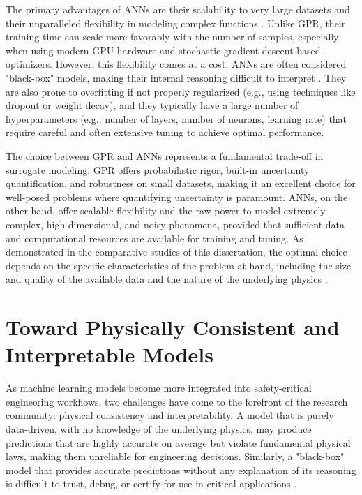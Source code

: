 \documentclass[dsc, EN]{ufabcFHZh}
\begin{document}
The primary advantages of ANNs are their scalability to very large datasets and their unparalleled flexibility in modeling complex functions \citep{jain2025nonintrusive}. Unlike GPR, their training time can scale more favorably with the number of samples, especially when using modern GPU hardware and stochastic gradient descent-based optimizers. However, this flexibility comes at a cost. ANNs are often considered "black-box" models, making their internal reasoning difficult to interpret \citep{wang2007review}. They are also prone to overfitting if not properly regularized (e.g., using techniques like dropout or weight decay), and they typically have a large number of hyperparameters (e.g., number of layers, number of neurons, learning rate) that require careful and often extensive tuning to achieve optimal performance.

The choice between GPR and ANNs represents a fundamental trade-off in surrogate modeling. GPR offers probabilistic rigor, built-in uncertainty quantification, and robustness on small datasets, making it an excellent choice for well-posed problems where quantifying uncertainty is paramount. ANNs, on the other hand, offer scalable flexibility and the raw power to model extremely complex, high-dimensional, and noisy phenomena, provided that sufficient data and computational resources are available for training and tuning. As demonstrated in the comparative studies of this dissertation, the optimal choice depends on the specific characteristics of the problem at hand, including the size and quality of the available data and the nature of the underlying physics \citep{wang2007review, anonymous2022gaussian}.

\section{Toward Physically Consistent and Interpretable Models}

As machine learning models become more integrated into safety-critical engineering workflows, two challenges have come to the forefront of the research community: physical consistency and interpretability. A model that is purely data-driven, with no knowledge of the underlying physics, may produce predictions that are highly accurate on average but violate fundamental physical laws, making them unreliable for engineering decisions. Similarly, a "black-box" model that provides accurate predictions without any explanation of its reasoning is difficult to trust, debug, or certify for use in critical applications \citep{wang2007review}.
\end{document}
